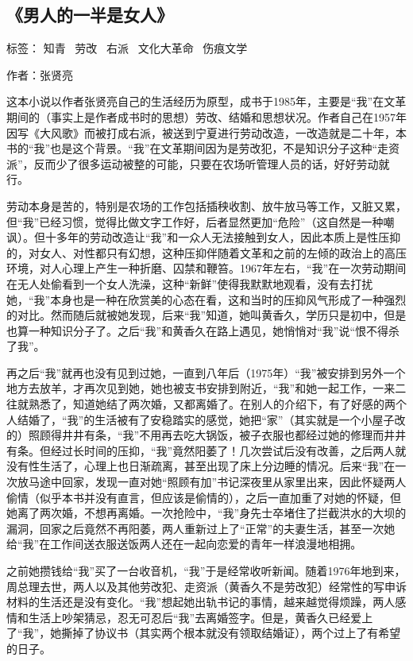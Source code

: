 \subsection{《男人的一半是女人》}

标签： 知青 \ 劳改 \ 右派  \ 文化大革命 \ 伤痕文学

作者：张贤亮

这本小说以作者张贤亮自己的生活经历为原型，成书于1985年，主要是“我”在文革期间的（事实上是作者成书时的思想）劳改、结婚和思想状况。作者自己在1957年因写《大风歌》而被打成右派，被送到宁夏进行劳动改造，一改造就是二十年，本书的“我”也是这个背景。“我”在文革期间因为是劳改犯，不是知识分子这种“走资派”，反而少了很多运动被整的可能，只要在农场听管理人员的话，好好劳动就行。

劳动本身是苦的，特别是农场的工作包括插秧收割、放牛放马等工作，又脏又累，但“我”已经习惯，觉得比做文字工作好，后者显然更加“危险”（这自然是一种嘲讽）。但十多年的劳动改造让“我”和一众人无法接触到女人，因此本质上是性压抑的，对女人、对性都只有幻想，这种压抑伴随着文革和之前的左倾的政治上的高压环境，对人心理上产生一种折磨、囚禁和鞭笞。1967年左右，“我”在一次劳动期间在无人处偷看到一个女人洗澡，这种“新鲜”使得我默默地观看，没有去打扰她，“我”本身也是一种在欣赏美的心态在看，这和当时的压抑风气形成了一种强烈的对比。然而随后就被她发现，后来“我”知道，她叫黄香久，学历只是初中，但是也算一种知识分子了。之后“我”和黄香久在路上遇见，她悄悄对“我”说“恨不得杀了我”。

再之后“我”就再也没有见到过她，一直到八年后（1975年）“我”被安排到另外一个地方去放羊，才再次见到她，她也被支书安排到附近，“我”和她一起工作，一来二往就熟悉了，知道她结了两次婚，又都离婚了。在别人的介绍下，有了好感的两个人结婚了，“我”的生活被有了安稳踏实的感觉，她把“家”（其实就是一个小屋子改的）照顾得井井有条，“我”不用再去吃大锅饭，被子衣服也都经过她的修理而井井有条。但经过长时间的压抑，“我”竟然阳萎了！几次尝试后没有改善，之后两人就没有性生活了，心理上也日渐疏离，甚至出现了床上分边睡的情况。后来“我”在一次放马途中回家，发现一直对她“照顾有加”书记深夜里从家里出来，因此怀疑两人偷情（似乎本书并没有直言，但应该是偷情的），之后一直加重了对她的怀疑，但她离了两次婚，不想再离婚。一次抢险中，“我”身先士卒堵住了拦截洪水的大坝的漏洞，回家之后竟然不再阳萎，两人重新过上了“正常”的夫妻生活，甚至一次她给“我”在工作间送衣服送饭两人还在一起向恋爱的青年一样浪漫地相拥。

之前她攒钱给“我”买了一台收音机，“我”于是经常收听新闻。随着1976年地到来，周总理去世，两人以及其他劳改犯、走资派（黄香久不是劳改犯）经常性的写申诉材料的生活还是没有变化。“我”想起她出轨书记的事情，越来越觉得烦躁，两人感情和生活上吵架猜忌，忍无可忍后“我”去离婚签字。但是，黄香久已经爱上了“我”，她撕掉了协议书（其实两个根本就没有领取结婚证），两个过上了有希望的日子。

